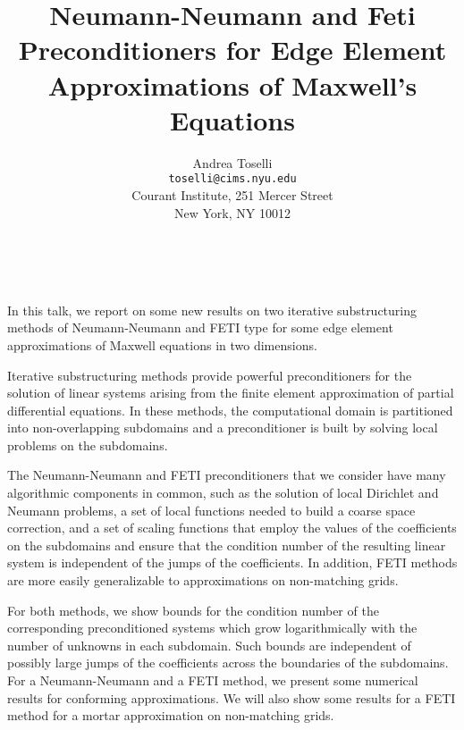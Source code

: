 \documentclass[11pt]{article}
\date{ ~ \hspace{-4mm}}
\title{Neumann-Neumann and Feti Preconditioners for Edge Element Approximations of Maxwell's Equations  }
\author{Andrea Toselli \\ {\tt  toselli@cims.nyu.edu} \\ Courant Institute, 251 Mercer Street \\ New York, NY 10012}
\begin{document}
\maketitle
\thispagestyle{empty}





 



In this talk, we report on some new results on two iterative
substructuring methods of Neumann-Neumann and FETI type 
for some edge element approximations
of Maxwell equations in two dimensions. 



Iterative substructuring methods provide powerful
preconditioners for the solution of
linear systems arising from the finite element approximation
of partial differential equations.
In these methods, the computational domain is
partitioned into non-overlapping subdomains and a
preconditioner is built by solving local problems on the subdomains.



The Neumann-Neumann and FETI preconditioners that we consider have many 
algorithmic components in common, such as the solution of local
Dirichlet and Neumann problems, a set of local functions needed
to build a coarse space correction, and a set of scaling functions
that employ the values of the coefficients on the subdomains
and ensure that the condition number of the resulting linear
system is independent of the jumps of the coefficients.
In addition, FETI methods are more easily generalizable to approximations
on non-matching grids.



For both methods, we show  bounds for the condition number of the
corresponding preconditioned systems which grow logarithmically with 
the number of unknowns in each subdomain. Such bounds are independent of 
possibly large jumps of the coefficients across the boundaries of the 
subdomains.
For a Neumann-Neumann and a FETI method, 
we present some numerical results for conforming
approximations. We will also show some results for a FETI method
for a mortar approximation on non-matching grids.
\end{document}
